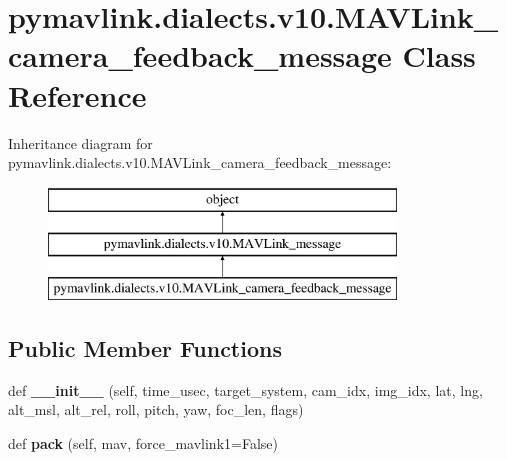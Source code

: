 \hypertarget{classpymavlink_1_1dialects_1_1v10_1_1MAVLink__camera__feedback__message}{}\section{pymavlink.\+dialects.\+v10.\+M\+A\+V\+Link\+\_\+camera\+\_\+feedback\+\_\+message Class Reference}
\label{classpymavlink_1_1dialects_1_1v10_1_1MAVLink__camera__feedback__message}
Inheritance diagram for pymavlink.\+dialects.\+v10.\+M\+A\+V\+Link\+\_\+camera\+\_\+feedback\+\_\+message\+:\begin{figure}[H]
\begin{center}
\leavevmode
\includegraphics[height=3.000000cm]{classpymavlink_1_1dialects_1_1v10_1_1MAVLink__camera__feedback__message}
\end{center}
\end{figure}
\subsection*{Public Member Functions}
\begin{DoxyCompactItemize}
\item 
\mbox{\label{classpymavlink_1_1dialects_1_1v10_1_1MAVLink__camera__feedback__message_a9e5ed26ad64fe863ac051568b1255868}} 
def {\bfseries \+\_\+\+\_\+init\+\_\+\+\_\+} (self, time\+\_\+usec, target\+\_\+system, cam\+\_\+idx, img\+\_\+idx, lat, lng, alt\+\_\+msl, alt\+\_\+rel, roll, pitch, yaw, foc\+\_\+len, flags)
\item 
\mbox{\label{classpymavlink_1_1dialects_1_1v10_1_1MAVLink__camera__feedback__message_a6c79913320c2fa549d9f101439be8c31}} 
def {\bfseries pack} (self, mav, force\+\_\+mavlink1=False)
\end{DoxyCompactItemize}
